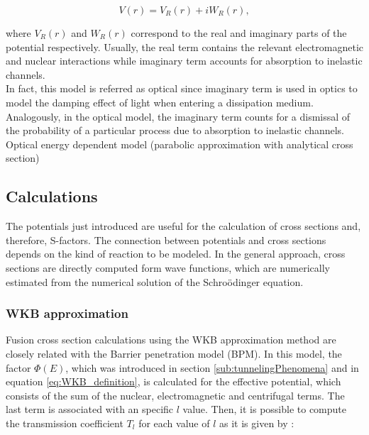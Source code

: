 \documentclass[openany]{book}
\begin{document}
\begin{equation}  \label{eq:potential_Optical}
	V(r) = V_R(r) + iW_R(r),
\end{equation}

where $V_R(r)$ and $W_R(r)$ correspond to the real and imaginary parts of the potential respectively. Usually, the real term contains the relevant electromagnetic and nuclear interactions while imaginary term accounts for absorption to inelastic channels. \\

In fact, this model is referred as optical since imaginary term is used in optics to model the damping effect of light when entering a dissipation medium. Analogously, in the optical model, the imaginary term counts for a dismissal of the probability of a particular process due to absorption to inelastic channels. \\

Optical energy dependent model (parabolic approximation with analytical cross section) \cite{singh_sukhvinder_kharab_2013B}

\subsection{Calculations}  \label{sub:potential_calculations}

The potentials just introduced are useful for the calculation of cross sections and, therefore, S-factors. The connection between potentials and cross sections depends on the kind of reaction to be modeled. In the general approach, cross sections are directly computed form wave functions,  which are numerically estimated from the numerical solution of the Schroödinger equation. \\

\subsubsection{WKB approximation} \label{ssub:potential_calculations_WKB}

Fusion cross section calculations using the WKB approximation method are closely related with the Barrier penetration model (BPM). In this model,  the factor $\Phi(E)$, which was introduced in section \ref{sub:tunnelingPhenomena} and in equation \ref{eq:WKB_definition}, is calculated for the effective potential, which consists of the sum of the nuclear, electromagnetic and centrifugal terms. The last term is associated with an specific $l$ value. Then, it is possible to compute the transmission coefficient $T_l$ for each value of $l$ as it is given by \cite{koyuncu_soylu_2018}:
\end{document}
